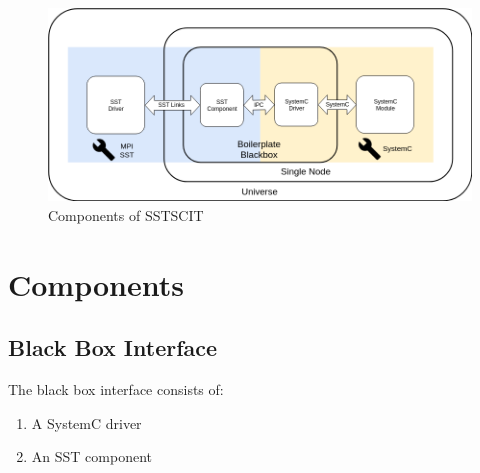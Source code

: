 \documentclass{article}
\begin{document}
  \begin{figure}[!h]
    \centering
    \includegraphics[width=6in]{diagrams/comm.png}
    \caption{Components of SSTSCIT}
    \label{fig:comm}
  \end{figure}

  \section{Components} \label{sec:comp}

    \subsection{Black Box Interface}
    The black box interface consists of:
    \begin{enumerate}
      \item A SystemC driver
      \item An SST component
    \end{enumerate}
\end{document}
